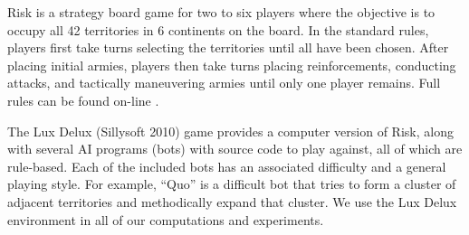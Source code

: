 \documentclass[letterpaper]{article}
\numberwithin{equation}{section}
\numberwithin{theorem}{section}
\numberwithin{lemma}{section}
\numberwithin{df}{section}
\begin{document}
Risk is a strategy board game for two to six players where the objective is to occupy all 42 territories in 6 continents on the board.  %
In the standard rules, players first take turns selecting the territories until all have been chosen.  After placing initial armies, players then take turns placing reinforcements, conducting attacks, and tactically maneuvering armies until only one player remains.  %
Full rules can be found on-line \cite{Risk}. %

The Lux Delux (Sillysoft 2010) \nocite{Lux} %
game provides a computer version of Risk, along with several AI programs (bots) with source code to play against, all of which are rule-based.  Each of the included bots has an associated difficulty and a general playing style.  For example, ``Quo'' is a difficult bot that tries to form a cluster of adjacent territories and methodically expand that cluster.  We use the Lux Delux environment in all of our computations and experiments.
\end{document}
